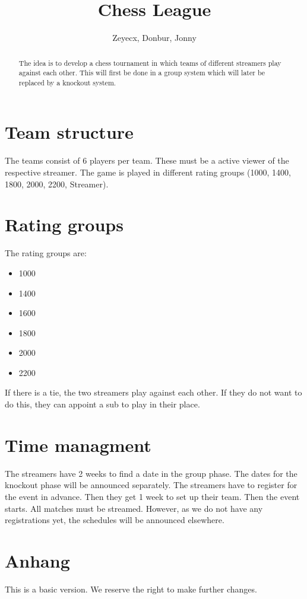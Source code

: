 \documentclass[preprint,12pt]{elsarticle}
\begin{document}
	
\begin{frontmatter}
			
\title{Chess League}
		
		
\author{Zeyecx, Donbur, Jonny}
		
\address{German Paper}
	 
\begin{abstract}
	The idea is to develop a chess tournament in which teams of different streamers play against each other.
	This will first be done in a group system which will later be replaced by a knockout system. 
\end{abstract}
\end{frontmatter}

\section{Team structure}
The teams consist of 6 players per team. These must be a active viewer of the respective streamer. 
The game is played in different rating groups (1000, 1400, 1800, 2000, 2200, Streamer).

\section{Rating groups}

The rating groups are:
\begin{itemize}
	\item 1000
	\item 1400 
	\item 1600
	\item 1800
	\item 2000
	\item 2200
\end{itemize}
If there is a tie, the two streamers play against each other. If they do not want to do this, they can appoint a sub to play in their place.

\section{Time managment}
The streamers have 2 weeks to find a date in the group phase. The dates for the knockout phase will be announced separately.
The streamers have to register for the event in advance. Then they get 1 week to set up their team.
Then the event starts.
All matches must be streamed.
However, as we do not have any registrations yet, the schedules will be announced elsewhere.


\section{Anhang}
This is a basic version. We reserve the right to make further changes.




\end{document}

